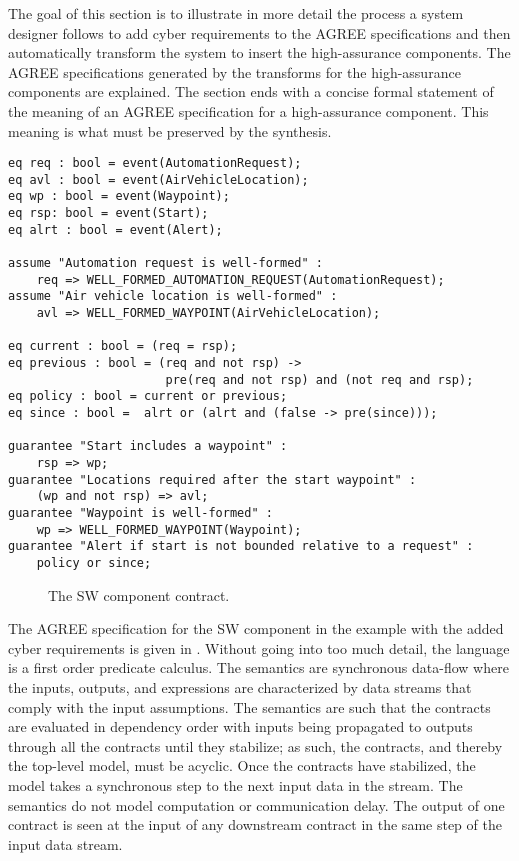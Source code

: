 The goal of this section is to illustrate in more detail the process a system designer follows to add cyber requirements to the AGREE specifications and then automatically transform the system to insert the high-assurance components. The AGREE specifications generated by the transforms for the high-assurance components are explained. The section ends with a concise formal statement of the meaning of an AGREE specification for a high-assurance component. This meaning is what must be preserved by the synthesis.

\newsavebox{\sw}
\begin{lrbox}{\sw}
\begin{lstlisting}[style=agree]
eq req : bool = event(AutomationRequest);
eq avl : bool = event(AirVehicleLocation);
eq wp : bool = event(Waypoint);
eq rsp: bool = event(Start);
eq alrt : bool = event(Alert);
            
assume "Automation request is well-formed" :
    req => WELL_FORMED_AUTOMATION_REQUEST(AutomationRequest);
assume "Air vehicle location is well-formed" :
    avl => WELL_FORMED_WAYPOINT(AirVehicleLocation);

eq current : bool = (req = rsp);
eq previous : bool = (req and not rsp) ->
                      pre(req and not rsp) and (not req and rsp);
eq policy : bool = current or previous;
eq since : bool =  alrt or (alrt and (false -> pre(since)));

guarantee "Start includes a waypoint" :
    rsp => wp;
guarantee "Locations required after the start waypoint" :
    (wp and not rsp) => avl;
guarantee "Waypoint is well-formed" :
    wp => WELL_FORMED_WAYPOINT(Waypoint);
guarantee "Alert if start is not bounded relative to a request" :
    policy or since;
\end{lstlisting}
\end{lrbox}

\begin{figure}
  \begin{center}
    \scalebox{0.60}{\usebox{\sw}}
  \end{center}
  \caption{The SW component contract.}
  \label{fig:sw}
\end{figure}

The AGREE specification for the SW component in the example with the added cyber requirements is given in . Without going into too much detail, the language is a first order predicate calculus. The semantics are synchronous data-flow where the inputs, outputs, and expressions are characterized by data streams that comply with the input assumptions. The semantics are such that the contracts are evaluated in dependency order with inputs being propagated to outputs through all the contracts until they stabilize; as such, the contracts, and thereby the top-level model, must be acyclic. Once the contracts have stabilized, the model takes a synchronous step to the next input data in the stream. The semantics do not model computation or communication delay. The output of one contract is seen at the input of any downstream contract in the same step of the input data stream. 

